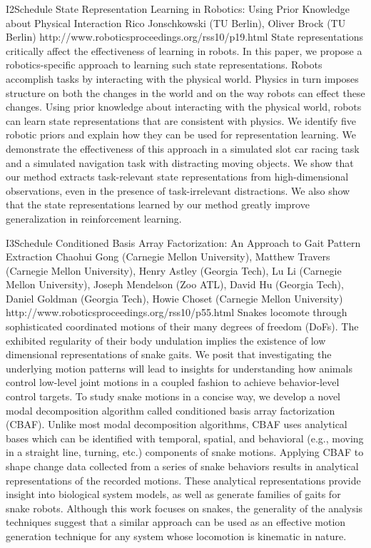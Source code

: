 \begin{spacing}{1.0}
\descriptionPaper
{I2}{Schedule}
{	
State Representation Learning in Robotics: Using Prior Knowledge about Physical Interaction
}
{
Rico Jonschkowski (TU Berlin), Oliver Brock (TU Berlin)
}
{
http://www.roboticsproceedings.org/rss10/p19.html
}
{
State representations critically affect the effectiveness of learning in robots. In this paper, we propose a robotics-specific approach to learning such state representations. Robots accomplish tasks by interacting with the physical world. Physics in turn imposes structure on both the changes in the world and on the way robots can effect these changes. Using prior knowledge about interacting with the physical world, robots can learn state representations that are consistent with physics. We identify five robotic priors and explain how they can be used for representation learning. We demonstrate the effectiveness of this approach in a simulated slot car racing task and a simulated navigation task with distracting moving objects. We show that our method extracts task-relevant state representations from high-dimensional observations, even in the presence of task-irrelevant distractions. We also show that the state representations learned by our method greatly improve generalization in reinforcement learning.
}





\descriptionPaper
{I3}{Schedule}
{	
Conditioned Basis Array Factorization: An Approach to Gait Pattern Extraction 
}
{
Chaohui Gong (Carnegie Mellon University), Matthew Travers (Carnegie Mellon University), Henry Astley (Georgia Tech), Lu Li (Carnegie Mellon University), Joseph Mendelson (Zoo ATL), David Hu (Georgia Tech), Daniel Goldman (Georgia Tech), Howie Choset (Carnegie Mellon University)
}
{
http://www.roboticsproceedings.org/rss10/p55.html
}
{
Snakes locomote through sophisticated coordinated motions of their many degrees of freedom (DoFs). The exhibited regularity of their body undulation implies the existence of low dimensional representations of snake gaits. We posit that investigating the underlying motion patterns will lead to insights for understanding how animals control low-level joint motions in a coupled fashion to achieve behavior-level control targets. To study snake motions in a concise way, we develop a novel modal decomposition algorithm called conditioned basis array factorization (CBAF). Unlike most modal decomposition algorithms, CBAF uses analytical bases which can be identified with temporal, spatial, and behavioral (e.g., moving in a straight line, turning, etc.) components of snake motions. Applying CBAF to shape change data collected from a series of snake behaviors results in analytical representations of the recorded motions. These analytical representations provide insight into biological system models, as well as generate families of gaits for snake robots. Although this work focuses on snakes, the generality of the analysis techniques suggest that a similar approach can be used as an effective motion generation technique for any system whose locomotion is kinematic in nature.
}




\end{spacing}
